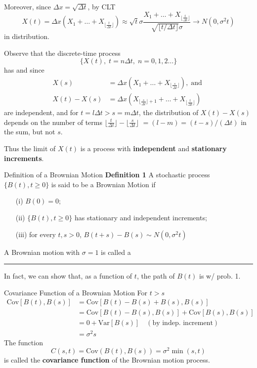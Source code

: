 \documentclass[letterpaper]{beamer}
\def\V{\mathrm{Var}}
\def\CV{\mathrm{Cov}}
\def\dt{\Delta}
\begin{document}
\begin{frame}
Moreover, since $\dt x=\sqrt{\dt t}$, by CLT
$$
X(t)=\dt x(X_1+\ldots+X_{\lfloor \frac{t}{\dt t} \rfloor})\approx\sqrt{t}\sigma\frac{X_1+\ldots+X_{\lfloor \frac{t}{\dt t}\rfloor}}{\sqrt{\lfloor t/\dt t\rfloor}\sigma}\to N(0,\sigma^2t)
$$
in distribution.\par\bigskip

Observe that the discrete-time process $$\{X(t),\;t=n\dt t,\;n=0,1,2\ldots\}$$ has
 and  since
\begin{align*}
X(s)&= \dt x(X_1+\ldots+X_{\lfloor \frac{s}{\dt t}\rfloor}),\;\text{and }\\[-2pt]
X(t)-X(s)&= \dt x(X_{\lfloor \frac{s}{\dt t}\rfloor+1}+\ldots+X_{\lfloor \frac{t}{\dt t}\rfloor})
\end{align*}
are independent, and for $t=l\dt t > s=m\dt t$, the distribution of $X(t)-X(s)$
depends on the number of terms $\lfloor \frac{t}{\dt t}\rfloor-\lfloor \frac{s}{\dt t}\rfloor$ $=(l-m)=(t-s)/(\dt t)$ in the sum, but not $s$.\medskip

Thus the limit of $X(t)$ is a process with {\bf independent} and {\bf stationary increments}.
\end{frame}
\begin{frame}{Definition of a Brownian Motion}
\textbf{Definition 1}
A stochastic process $\{B(t), t \ge 0\}$ is said to be a Brownian Motion if
\begin{itemize}
\item[(i)] $B(0) = 0$;
\item[(ii)] $\{B(t), t \ge 0\}$ has stationary and independent increments;
\item[(iii)] for every $t,s > 0$, $B(t+s)-B(s)\sim N(0,\sigma^2t)$
\end{itemize}
A Brownian motion with $\sigma=1$ is called a 

\medskip\hrule\medskip
In fact, we can show that, as a function of $t$, the path of $B(t)$ is  w/ prob. 1.
\end{frame}
\begin{frame}{Covariance Function of a Brownian Motion}
For $t>s$
\begin{align*}
\CV[B(t),B(s)]&=\CV[B(t)-B(s)+B(s),B(s)]\\
&=\CV[B(t)-B(s),B(s)]+\CV[B(s),B(s)]\\
&=0+\V[B(s)]\quad(\text{by indep. increment})\\
&=\sigma^2s
\end{align*}
The function
$$C(s, t)=\CV(B(t),B(s))=\sigma^2\min(s,t)$$
is called the {\bf covariance function} of the Brownian motion process.\bigskip
\end{frame}
\end{document}
